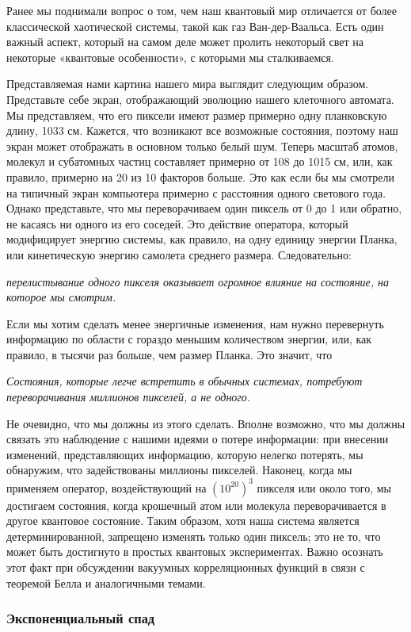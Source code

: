 \documentclass[main.tex]{subfiles}
\begin{document}
Ранее мы поднимали вопрос о том, чем наш квантовый мир отличается от более классической хаотической системы, такой как газ Ван-дер-Ваальса. Есть один важный аспект, который на самом деле может пролить некоторый свет на некоторые «квантовые особенности», с которыми мы сталкиваемся.

Представляемая нами картина нашего мира выглядит следующим образом. Представьте себе экран, отображающий эволюцию нашего клеточного автомата. Мы представляем, что его пиксели имеют размер примерно одну планковскую длину, 1033 см. Кажется, что возникают все возможные состояния, поэтому наш экран может отображать в основном только белый шум. Теперь масштаб атомов, молекул и субатомных частиц составляет примерно от 108 до 1015 см, или, как правило, примерно на 20 из 10 факторов больше. Это как если бы мы смотрели на типичный экран компьютера примерно с расстояния одного светового года.
Однако представьте, что мы переворачиваем один пиксель от 0 до 1 или обратно, не касаясь ни одного из его соседей. Это действие оператора, который модифицирует энергию системы, как правило, на одну единицу энергии Планка, или кинетическую энергию самолета среднего размера. Следовательно:

\textit{перелистывание одного пикселя оказывает огромное влияние на состояние, на которое мы смотрим.}

Если мы хотим сделать менее энергичные изменения, нам нужно перевернуть информацию по области с гораздо меньшим количеством энергии, или, как правило, в тысячи раз больше, чем размер Планка. Это значит, что

\textit{Состояния, которые легче встретить в обычных системах, потребуют переворачивания миллионов пикселей, а не одного.}

Не очевидно, что мы должны из этого сделать. Вполне возможно, что мы должны связать это наблюдение с нашими идеями о потере информации: при внесении изменений, представляющих информацию, которую нелегко потерять, мы обнаружим, что задействованы миллионы пикселей.
Наконец, когда мы применяем оператор, воздействующий на $(10^{20})^3$ пикселя или около того, мы достигаем состояния, когда крошечный атом или молекула переворачивается в другое квантовое состояние. Таким образом, хотя наша система является детерминированной, запрещено изменять только один пиксель; это не то, что может быть достигнуто в простых квантовых экспериментах. Важно осознать этот факт при обсуждении вакуумных корреляционных функций в связи с теоремой Белла и аналогичными темами.

\subsubsection{Экспоненциальный спад}\label{ch5.7.7}
\end{document}
